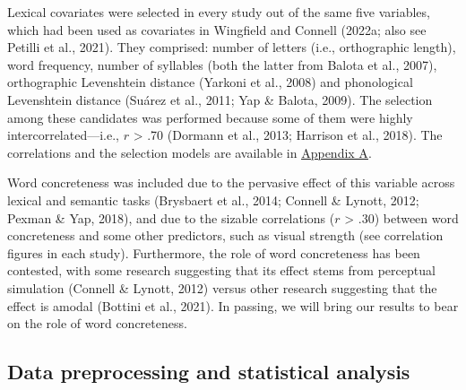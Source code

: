 \documentclass[
  12pt,
  man,floatsintext]{apa7}
\begin{document}
Lexical covariates were selected in every study out of the same five variables, which had been used as covariates in Wingfield and Connell (2022a; also see Petilli et al., 2021). They comprised: number of letters (i.e., orthographic length), word frequency, number of syllables (both the latter from Balota et al., 2007), orthographic Levenshtein distance (Yarkoni et al., 2008) and phonological Levenshtein distance (Suárez et al., 2011; Yap \& Balota, 2009). The selection among these candidates was performed because some of them were highly intercorrelated---i.e., \(r\) \textgreater{} .70 (Dormann et al., 2013; Harrison et al., 2018). The correlations and the selection models are available in \protect\hyperlink{appendix-A-lexical-covariates}{\underline{Appendix A}}.

Word concreteness was included due to the pervasive effect of this variable across lexical and semantic tasks (Brysbaert et al., 2014; Connell \& Lynott, 2012; Pexman \& Yap, 2018), and due to the sizable correlations (\(r\) \textgreater{} .30) between word concreteness and some other predictors, such as visual strength (see correlation figures in each study). Furthermore, the role of word concreteness has been contested, with some research suggesting that its effect stems from perceptual simulation (Connell \& Lynott, 2012) versus other research suggesting that the effect is amodal (Bottini et al., 2021). In passing, we will bring our results to bear on the role of word concreteness.

\hypertarget{data-preprocessing-and-statistical-analysis}{%
\subsection{Data preprocessing and statistical analysis}\label{data-preprocessing-and-statistical-analysis}}
\end{document}
